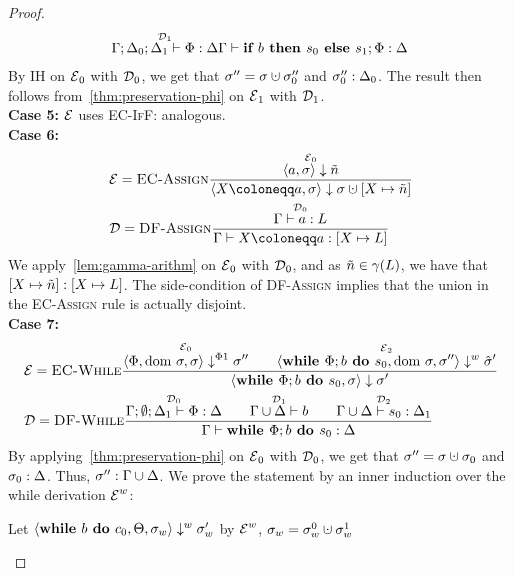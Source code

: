 \begin{proof}
\begin{align*}
{        \overset{\operatorname{\mathcal{D}}_1}{\Gamma;\Delta_0;\Delta_1 \vdash {\Phi}: \Delta}}
        {\Gamma \vdash {\textbf{if }{b} \textbf{ then }{s_0}\textbf{ else }{s_1};{\Phi}}: \Delta}
    \end{align*}
    By IH on $\operatorname{\mathcal{E}}_0$ with $\operatorname{\mathcal{D}}_0$, we get that $\store'' = \store \dunion \store''_0$ and 
    ${\sigma''_0}:{\Delta_0}$.
    The result then follows from~\autoref{thm:preservation-phi} on $\operatorname{\mathcal{E}}_1$ with $\operatorname{\mathcal{D}}_1$.\\
    \textbf{Case 5:}
    $\operatorname{\mathcal{E}}$ uses \textsc{EC-IfF}: analogous.\\
    \textbf{Case 6:}
    \begin{align*}
        &\E = \bsrule{EC-Assign}{\overset{\E_0}{\bigstep{a}{\store}{\flaggedn{}}}}
        {\bigstep{\defaultstore}{\store}{\storeassign{\store}{X \mapsto \flaggedn{}}}}\\
        &\D = \trule{DF-Assign}{\overset{\D_0}{\typestep{\Gamma}{a}{L}}}
        {\typestep{\Gamma}{\defaultstore}{[X \mapsto L]}}
    \end{align*}
    We apply~\autoref{lem:gamma-arithm} on $\operatorname{\mathcal{E}}_0$ with $\operatorname{\mathcal{D}}_0$,
    and as $\flaggedn{} \in \gamma(L)$, we have that $\matches{[X \mapsto \flaggedn{}]}{[X \mapsto L]}$.
    The side-condition of \textsc{DF-Assign} implies that the union in the \textsc{EC-Assign}
    rule is actually disjoint.
    \\
    \textbf{Case 7:}\\
    \begin{align*}
        &\operatorname{\mathcal{E}} = \textsc{EC-While}\frac{\displaystyle \overset{\operatorname{\mathcal{E}}_0}{\langle \Phi, \text{dom }{\sigma}, \sigma \rangle \downarrow^{\Phi1} \sigma''}\qquad
        \overset{\operatorname{\mathcal{E}}_2}{\langle \textbf{while }\Phi;{b} \textbf{ do } {s_0}, \text{dom }{\sigma}, \sigma'' \rangle \downarrow^w \hat{\sigma}'}}{\displaystyle \langle \textbf{while }\Phi;{b} \textbf{ do } {s_0}, \sigma \rangle \downarrow \sigma'}\\
        &\operatorname{\mathcal{D}} = \textsc{DF-While}\frac{\displaystyle \overset{\operatorname{\mathcal{D}}_0}{\Gamma;\emptyset;\Delta_1 \vdash {\Phi}: \Delta}\qquad
        \overset{\operatorname{\mathcal{D}}_1}{\Gamma \cup \Delta \vdash {b}}\qquad
        \overset{\operatorname{\mathcal{D}}_2}{\Gamma \cup \Delta \vdash {s_0}: \Delta_1}}{\displaystyle \Gamma \vdash {\textbf{while }\Phi;{b} \textbf{ do } {s_0}}: \Delta}
    \end{align*}
    By applying~\autoref{thm:preservation-phi} on $\operatorname{\mathcal{E}}_0$ with $\operatorname{\mathcal{D}}_0$, we get that
    $\store'' = \store \dunion \store_0$ and ${\sigma_0}:{\Delta}$.
    Thus, ${\sigma''}:{\Gamma \cup \Delta}$.
    We prove the statement by an inner induction over the while derivation $\operatorname{\mathcal{E}}^w$:
    \begin{claim}
        Let $\langle \textbf{while }{b} \textbf{ do } {c_0}, \Theta, \sigma_w \rangle \downarrow^w \sigma_w'$ by $\operatorname{\mathcal{E}}^w$,
         $\store_w = \store_w^0 \dunion \store_w^1$

\end{claim}
\end{proof}
